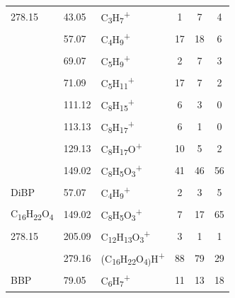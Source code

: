 {\begin{longtable}[c]{lllccc}
278.15                                                   & 43.05  & C\textsubscript{3}H\textsubscript{7}\textsuperscript{+}                   & 1  & 7  & 4  \\
                                                         & 57.07  & C\textsubscript{4}H\textsubscript{9}\textsuperscript{+}                   & 17 & 18 & 6  \\
                                                         & 69.07  & C\textsubscript{5}H\textsubscript{9}\textsuperscript{+}                   & 2  & 7  & 3  \\
                                                         & 71.09  & C\textsubscript{5}H\textsubscript{11}\textsuperscript{+}                  & 17 & 7  & 2  \\
                                                         & 111.12 & C\textsubscript{8}H\textsubscript{15}\textsuperscript{+}                  & 6  & 3  & 0  \\
                                                         & 113.13 & C\textsubscript{8}H\textsubscript{17}\textsuperscript{+}                  & 6  & 1  & 0  \\
                                                         & 129.13 & C\textsubscript{8}H\textsubscript{17}O\textsuperscript{+}                 & 10 & 5  & 2  \\
                                                         & 149.02 & C\textsubscript{8}H\textsubscript{5}O\textsubscript{3}\textsuperscript{+} & 41 & 46 & 56 \\
\hline
DiBP      & 57.07                & C\textsubscript{4}H\textsubscript{9}\textsuperscript{+}                           & 2            & 3            & 5            \\
C\textsubscript{16}H\textsubscript{22}O\textsubscript{4}          & 149.02               & C\textsubscript{8}H\textsubscript{5}O\textsubscript{3}\textsuperscript{+}      & 7            & 17           & 65           \\
278.15          & 205.09               & C\textsubscript{12}H\textsubscript{13}O\textsubscript{3}\textsuperscript{+}    & 3            & 1            & 1            \\
          & 279.16               & (C\textsubscript{16}H\textsubscript{22}O\textsubscript{4)}H\textsuperscript{+} & 88           & 79           & 29           \\
\hline
BBP       & 79.05                & C\textsubscript{6}H\textsubscript{7}\textsuperscript{+}                           & 11           & 13           & 18           \\

\end{longtable}}
